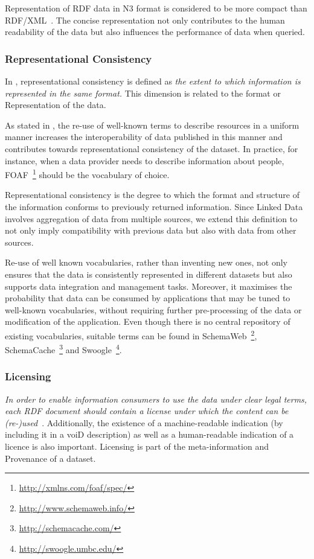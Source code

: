 Representation of RDF data in N3 format is considered to be more compact than RDF/XML~\cite{Flemming}.
The concise representation not only contributes to the human readability of the data but also influences the performance of data when queried. 

\subsubsection{Representational Consistency}
In \cite{Bizerthesis}, representational consistency is defined as \emph{the extent to which information is represented in the same format.}
This dimension is related to the format or Representation of the data.

As stated in \cite{Hogan:2012}, the re-use of well-known terms to describe resources in a uniform manner increases the interoperability of data published in this manner and contributes towards representational consistency of the dataset.
In practice, for instance, when a data provider needs to describe information about people, FOAF~\footnote{\url{http://xmlns.com/foaf/spec/}} should be the vocabulary of choice.

\begin{definition}
Representational consistency is the degree to which the format and structure of the information conforms to previously returned information. 
Since Linked Data involves aggregation of data from multiple sources, we extend this definition to not only imply compatibility with previous data but also with data from other sources. 
\end{definition}

Re-use of well known vocabularies, rather than inventing new ones,  not only ensures that the data is consistently represented in different datasets but also supports data integration and management tasks. 
Moreover, it maximises the probability that data can be consumed by applications that may be tuned to well-known vocabularies, without requiring further pre-processing of the data or modification of the application.
Even though there is no central repository of existing vocabularies, suitable terms can be found in SchemaWeb~\footnote{\url{http://www.schemaweb.info/}}, SchemaCache~\footnote{\url{http://schemacache.com/}} and Swoogle~\footnote{\url{http://swoogle.umbc.edu/}}.

\subsubsection{Licensing}
\emph{In order to enable information consumers to use the data under clear legal terms, each RDF document should contain a license under which the content can be (re-)used}~\cite{Hogan:2012, Flemming}.
Additionally, the existence of a machine-readable indication (by including it in a voiD description) as well as a human-readable indication of a licence is also important.
Licensing is part of the meta-information and Provenance of a dataset.

